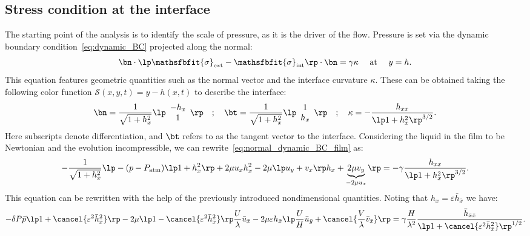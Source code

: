 \subsection{Stress condition at the interface}
 The starting point of the analysis is to identify the scale of pressure, as it is the driver of the flow. Pressure is set via the dynamic boundary condition~\eqref{eq:dynamic_BC} projected along the normal:
\begin{equation}
\bn\cdot\lp\mathsfbfit{\sigma}_\text{ext} - \mathsfbfit{\sigma}_\text{int}\rp \cdot\bn = \gamma \kappa \quad\text{ at }\quad y = h.
\label{eq:normal_dynamic_BC_film}
\end{equation}
This equation features geometric quantities such as the normal vector and the interface curvature $\kappa$. These can be obtained taking the following color function $\mathcal S(x,y,t) = y - h(x,t)$ to describe the interface:
\begin{equation}
\bn = \frac{1}{\sqrt{1+h_x^2}}
\lp
\begin{array}{c}
-h_x\\
1
\end{array}
\rp
\quad
;
\quad
\bt = \frac{1}{\sqrt{1+h_x^2}}
\lp
\begin{array}{c}
1\\
h_x
\end{array}
\rp
\quad
;
\quad
\kappa = - \frac{h_{xx}}{\lp 1+h_x^2 \rp^{3/2}}.
\end{equation}
Here subscripts denote differentiation, and $\bt$ refers to as the tangent vector to the interface. Considering the liquid in the film to be Newtonian and the evolution incompressible, we can rewrite~\eqref{eq:normal_dynamic_BC_film} as:
\begin{equation}
-\frac{1}{\sqrt{1+h_x^2}}\lp -(p-P_\text{atm})\lp1+h_x^2\rp+2\mu u_x h_x^2 -2\mu\lp u_y+v_x\rp h_x + \underbrace{2\mu v_y}_{-2\mu u_x}\rp=-\gamma\frac{h_{xx}}{\lp1+h_x^2\rp^{3/2}}.
\end{equation}
This equation can be rewritten with the help of the previously introduced nondimensional quantities. Noting that $h_x = \varepsilon \bar h_{\bar x}$ we have:
\begin{equation}
-\delta P \bar p \lp 1+ \cancel{\varepsilon^2 \bar h_{\bar x}^2} \rp - 2\mu\lp 1 - \cancel{\varepsilon^2 \bar h_{\bar x}^2}\rp \frac{U}{\lambda} \bar u_{\bar x} - 2 \mu \varepsilon h_{\bar x} \lp \frac{U}{H} \bar u_{\bar y} + \cancel{\frac{V}{\lambda} \bar v_{\bar x}} \rp = \gamma \frac{H}{\lambda^2} \frac{\bar h_{\bar x \bar x}}{\lp 1 + \cancel{\varepsilon^2 \bar h_{\bar x}^2} \rp^{1/2}}.
\end{equation}
